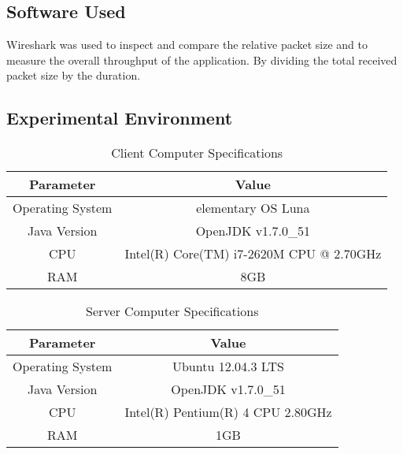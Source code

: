 \documentclass{article}
\begin{document}
\subsection{Software Used}
\begin{description}
\item{Wireshark} was used to inspect and compare the relative packet size and to measure the overall throughput of the application. By dividing the total received packet size by the duration. 
\end{description}

\subsection{Experimental Environment}
\begin{table}[h]
\begin{tabular}{|c|c|}
\hline
Parameter        & Value                                    \\ \hline
Operating System & elementary OS Luna     					\\ \hline
Java Version     & OpenJDK v1.7.0\_51                       \\ \hline
CPU              & Intel(R) Core(TM) i7-2620M CPU @ 2.70GHz \\ \hline
RAM              & 8GB                                      \\ \hline
\end{tabular}
\caption {Client Computer Specifications}
\end{table}


\begin{table}[h]
\begin{tabular}{|c|c|}
\hline
\textbf{Parameter}        & \textbf{Value}                                    \\ \hline
Operating System & Ubuntu 12.04.3 LTS    					\\ \hline
Java Version     & OpenJDK v1.7.0\_51                       \\ \hline
CPU              & Intel(R) Pentium(R) 4 CPU 2.80GHz 		\\ \hline
RAM              & 1GB                                      \\ \hline
\end{tabular}
\caption {Server Computer Specifications}
\end{table}

\end{document}
